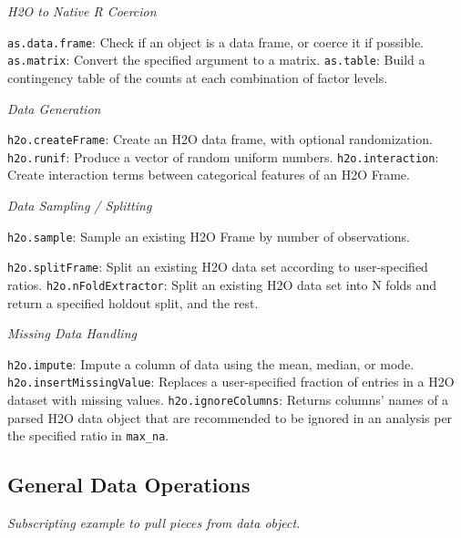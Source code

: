 \documentclass[11pt]{article}
\begin{document}
{\emph{H2O to Native R Coercion}\par
{\texttt{as.data.frame}}: Check if an object is a data frame, or coerce it if possible.\newline
{\texttt{as.matrix}}: Convert the specified argument to a matrix.\newline
 {\texttt{as.table}}: Build a contingency table of the counts at each combination of factor levels.\newline

\emph{Data Generation}\par
{\texttt{h2o.createFrame}}: Create an H2O data frame, with optional randomization.\newline
{\texttt{h2o.runif}}: Produce a vector of random uniform numbers.\newline
{\texttt{h2o.interaction}}: Create interaction terms between categorical features of an H2O Frame.\newline

\emph{Data Sampling / Splitting}\par
 {\texttt{h2o.sample}}: Sample an existing H2O Frame by number of observations.\newline
{\texttt{h2o.splitFrame}: Split an existing H2O data set according to user-specified ratios.\newline
{\texttt{h2o.nFoldExtractor}}: Split an existing H2O data set into N folds and return a specified holdout split, and the rest.\newline

\emph{Missing Data Handling}\par
{\texttt{h2o.impute}}: Impute a column of data using the mean, median, or mode.\newline
{\texttt{h2o.insertMissingValue}}: Replaces a user-specified fraction of entries in a H2O dataset with missing values.\newline
{\texttt{h2o.ignoreColumns}}: Returns columns' names of a parsed H2O data object that are recommended to be ignored in an analysis per the specified ratio in {\texttt{max\_na}}.\newline

\subsection{General Data Operations}

\emph{Subscripting example to pull pieces from data object.} 
}}
\end{document}
